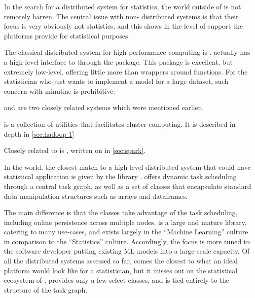 In the search for a distributed system for statistics, the world outside of \R{} is not remotely barren.
The central issue with non-\R{} distributed systems is that their focus is very obviously not statistics, and this shows in the level of support the platforms provide for statistical purposes.

The classical distributed system for high-performance computing is .
\R{} actually has a high-level interface to  through the 
package.
This package is excellent, but extremely low-level, offering little more than wrappers around  functions.
For the statistician who just wants to implement a model for a large dataset, such concern with minutiae is prohibitive.

 and  are two closely related systems which were mentioned
earlier.

 is a collection of utilities that facilitates cluster computing.
It is described in depth in \cref{sec:hadoop-1}

Closely related to  is , written on in \cref{sec:spark}.

In the  world, the closest match to a high-level distributed system that could have statistical application is given by the  library \cite{rocklin2015dask}.
 offers
dynamic task scheduling through a central task graph, as well as a set
of classes that encapsulate standard data manipulation structures such
as  arrays and  dataframes.

The main difference is that the  classes take advantage of the task scheduling, including online persistence across multiple nodes.
 is a large and mature library, catering to many use-cases,
and exists largely in the  ``Machine Learning'' culture in
comparison to the \R{} ``Statistics'' culture.
Accordingly, the focus is more tuned to the  software developer putting existing ML models into a large-scale capacity.
Of all the distributed systems assessed so far,  comes the closest to what an ideal platform would look like for a statistician, but it misses out on the statistical ecosystem of \R{}, provides only a few select classes, and is tied entirely to the structure of the task graph.
